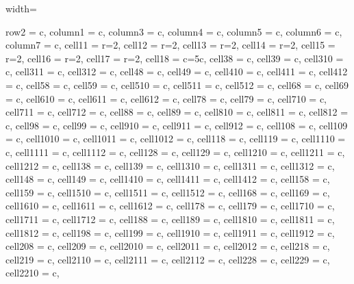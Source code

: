 \documentclass[journal]{IEEEtran}
\begin{document}
\begin{table}
\caption{Performance of the transfer learning experiments over AlexNet pre-trained model.}
\centering
\begin{adjustbox}{width=\textwidth}
\begin{tblr}{
  row{2} = {c},  column{1} = {c}, column{3} = {c},  column{4} = {c},  column{5} = {c},
  column{6} = {c},  column{7} = {c},  cell{1}{1} = {r=2}{},  cell{1}{2} = {r=2}{},
  cell{1}{3} = {r=2}{},  cell{1}{4} = {r=2}{},  cell{1}{5} = {r=2}{},  cell{1}{6} = {r=2}{},
  cell{1}{7} = {r=2}{},  cell{1}{8} = {c=5}{c},  cell{3}{8} = {c},  cell{3}{9} = {c},
  cell{3}{10} = {c},  cell{3}{11} = {c},  cell{3}{12} = {c},  cell{4}{8} = {c},
  cell{4}{9} = {c},  cell{4}{10} = {c},  cell{4}{11} = {c},  cell{4}{12} = {c},
  cell{5}{8} = {c},  cell{5}{9} = {c},  cell{5}{10} = {c},  cell{5}{11} = {c},
  cell{5}{12} = {c},  cell{6}{8} = {c},  cell{6}{9} = {c},  cell{6}{10} = {c},
  cell{6}{11} = {c},  cell{6}{12} = {c},  cell{7}{8} = {c},  cell{7}{9} = {c},
  cell{7}{10} = {c},  cell{7}{11} = {c},  cell{7}{12} = {c},  cell{8}{8} = {c},
  cell{8}{9} = {c},  cell{8}{10} = {c},  cell{8}{11} = {c},  cell{8}{12} = {c},
  cell{9}{8} = {c},  cell{9}{9} = {c},  cell{9}{10} = {c},  cell{9}{11} = {c},
  cell{9}{12} = {c},  cell{10}{8} = {c},  cell{10}{9} = {c},  cell{10}{10} = {c},
  cell{10}{11} = {c},  cell{10}{12} = {c},  cell{11}{8} = {c},  cell{11}{9} = {c},
  cell{11}{10} = {c},  cell{11}{11} = {c},  cell{11}{12} = {c},  cell{12}{8} = {c},
  cell{12}{9} = {c},  cell{12}{10} = {c},  cell{12}{11} = {c},  cell{12}{12} = {c},
  cell{13}{8} = {c},  cell{13}{9} = {c},  cell{13}{10} = {c},  cell{13}{11} = {c},
  cell{13}{12} = {c},  cell{14}{8} = {c},  cell{14}{9} = {c},  cell{14}{10} = {c},
  cell{14}{11} = {c},  cell{14}{12} = {c},  cell{15}{8} = {c},  cell{15}{9} = {c},
  cell{15}{10} = {c},  cell{15}{11} = {c},  cell{15}{12} = {c},  cell{16}{8} = {c},
  cell{16}{9} = {c},  cell{16}{10} = {c},  cell{16}{11} = {c},  cell{16}{12} = {c},
  cell{17}{8} = {c},  cell{17}{9} = {c},  cell{17}{10} = {c},  cell{17}{11} = {c},
  cell{17}{12} = {c},  cell{18}{8} = {c},  cell{18}{9} = {c},  cell{18}{10} = {c},
  cell{18}{11} = {c},  cell{18}{12} = {c},  cell{19}{8} = {c},  cell{19}{9} = {c},
  cell{19}{10} = {c},  cell{19}{11} = {c},  cell{19}{12} = {c},  cell{20}{8} = {c},
  cell{20}{9} = {c},  cell{20}{10} = {c},  cell{20}{11} = {c},  cell{20}{12} = {c},
  cell{21}{8} = {c},  cell{21}{9} = {c},  cell{21}{10} = {c},  cell{21}{11} = {c},
  cell{21}{12} = {c},  cell{22}{8} = {c},  cell{22}{9} = {c},  cell{22}{10} = {c},
}
\end{tblr}
\end{adjustbox}
\end{table}
\end{document}
